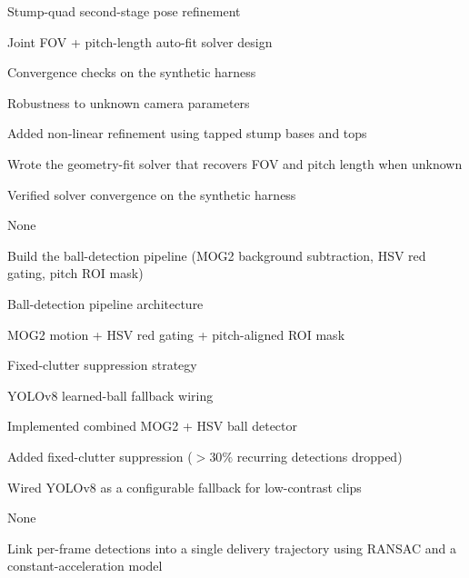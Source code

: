 \documentclass[12pt,a4paper]{report}
\begin{document}
%
{\begin{lblist}
\item Stump-quad second-stage pose refinement
\item Joint FOV + pitch-length auto-fit solver design
\item Convergence checks on the synthetic harness
\item Robustness to unknown camera parameters
\end{lblist}}%
{\begin{lblist}
\item Added non-linear refinement using tapped stump bases and tops
\item Wrote the geometry-fit solver that recovers FOV and pitch length when unknown
\item Verified solver convergence on the synthetic harness
\end{lblist}}%
{\begin{lblist}\item None\end{lblist}}%
{\begin{lblist}\item Build the ball-detection pipeline (MOG2 background subtraction, HSV red gating, pitch ROI mask)\end{lblist}}

%
{\begin{lblist}
\item Ball-detection pipeline architecture
\item MOG2 motion + HSV red gating + pitch-aligned ROI mask
\item Fixed-clutter suppression strategy
\item YOLOv8 learned-ball fallback wiring
\end{lblist}}%
{\begin{lblist}
\item Implemented combined MOG2 + HSV ball detector
\item Added fixed-clutter suppression ($>30\%$ recurring detections dropped)
\item Wired YOLOv8 as a configurable fallback for low-contrast clips
\end{lblist}}%
{\begin{lblist}\item None\end{lblist}}%
{\begin{lblist}\item Link per-frame detections into a single delivery trajectory using RANSAC and a constant-acceleration model\end{lblist}}
\end{document}
